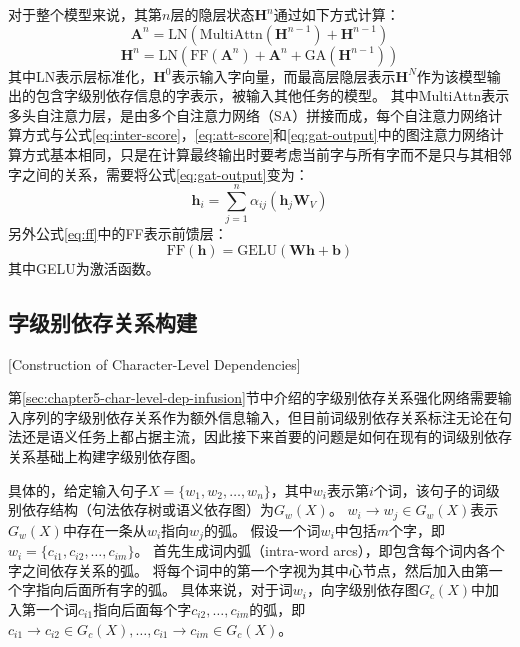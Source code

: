 对于整个模型来说，其第$n$层的隐层状态$\bm{H}^n$通过如下方式计算：
\begin{equation}
	\label{eq:multi-att}
	\bm{A}^n = \text{LN}(\text{MultiAttn}(\bm{H}^{n-1}) + \bm{H}^{n-1})
\end{equation}
\begin{equation}
	\label{eq:ff}
	\bm{H}^n = \text{LN}(\text{FF}(\bm{A}^{n}) + \bm{A}^{n} + \text{GA}(\bm{H}^{n-1}))
\end{equation}
其中LN表示层标准化，$\bm{H}^0$表示输入字向量，而最高层隐层表示$\bm{H}^N$作为该模型输出的包含字级别依存信息的字表示，被输入其他任务的模型。
其中MultiAttn表示多头自注意力层，是由多个自注意力网络（SA）拼接而成，每个自注意力网络计算方式与公式\ref{eq:inter-score}，\ref{eq:att-score}和\ref{eq:gat-output}中的图注意力网络计算方式基本相同，只是在计算最终输出时要考虑当前字与所有字而不是只与其相邻字之间的关系，需要将公式\ref{eq:gat-output}变为：
\begin{equation}
    \label{eq:sa-output}
	\bm{h}_i =\sum_{j=1}^{n}\alpha_{ij}(\bm{h}_j\bm{W}_V)
\end{equation}
另外公式\ref{eq:ff}中的FF表示前馈层：
\begin{equation}
    \text{FF}(\bm{h}) = \text{GELU}(\bm{W}\bm{h} + \bm{b})
\end{equation}
其中GELU为激活函数。

\subsection{字级别依存关系构建}[Construction of Character-Level Dependencies]

第\ref{sec:chapter5-char-level-dep-infusion}节中介绍的字级别依存关系强化网络需要输入序列的字级别依存关系作为额外信息输入，但目前词级别依存关系标注无论在句法还是语义任务上都占据主流，因此接下来首要的问题是如何在现有的词级别依存关系基础上构建字级别依存图。

具体的，给定输入句子$X = \{w_1, w_2, \dots, w_n\}$，其中$w_i$表示第$i$个词，该句子的词级别依存结构（句法依存树或语义依存图）为$G_w(X)$。
$w_i \rightarrow w_j \in G_w(X)$表示$G_w(X)$中存在一条从$w_i$指向$w_j$的弧。
假设一个词$w_i$中包括$m$个字，即$w_i=\{c_{i1}, c_{i2}, \dots, c_{im}\}$。
首先生成词内弧（intra-word arcs），即包含每个词内各个字之间依存关系的弧。
将每个词中的第一个字视为其中心节点，然后加入由第一个字指向后面所有字的弧。
具体来说，对于词$w_i$，向字级别依存图$G_c(X)$中加入第一个词$c_{i1}$指向后面每个字$c_{i2}, \dots, c_{im}$的弧，即$c_{i1} \rightarrow c_{i2} \in G_c(X), \dots, c_{i1} \rightarrow c_{im} \in G_c(X)$。

